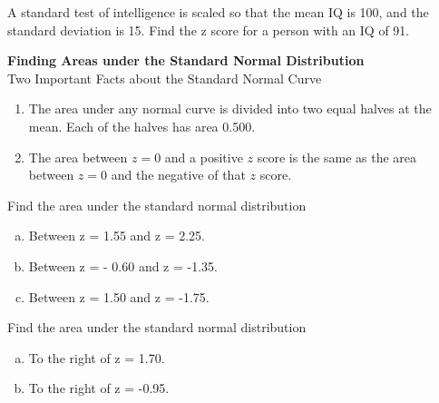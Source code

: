 \documentclass[12pt]{gWmaths}
\begin{document}
\begin{Exercise}
A standard test of intelligence is scaled so that the mean IQ is 100, and the standard deviation is 15. Find the z score for a person with an IQ of 91.
\vspace{10 in}
\end{Exercise}


\noindent
\textbf{Finding Areas under the Standard Normal Distribution}\\

\noindent
Two Important Facts about the Standard Normal Curve

\begin{enumerate}[1.]
\item The area under any normal curve is divided into two equal halves at the mean. Each of the halves has area 0.500.
\item The area between $z = 0$ and a positive $z$ score is the same as the area between $z = 0$ and the negative of that $z$ score.
\end{enumerate}


\begin{Exercise}
Find the area under the standard normal distribution 
\begin{enumerate}[a.]
\item Between z = 1.55 and z = 2.25.
\vspace{10 in}


\item Between z = - 0.60 and z = -1.35.
\vspace{10 in}


\item Between z = 1.50 and z = -1.75.
\vspace{10 in}


\end{enumerate}
\end{Exercise}



\begin{Exercise}
Find the area under the standard normal distribution 
\begin{enumerate}[a.]
\item To the right of z = 1.70.
\vspace{10 in}

\item To the right of z = -0.95.
\vspace{3 in}
\end{enumerate}
\end{Exercise}
\end{document}
